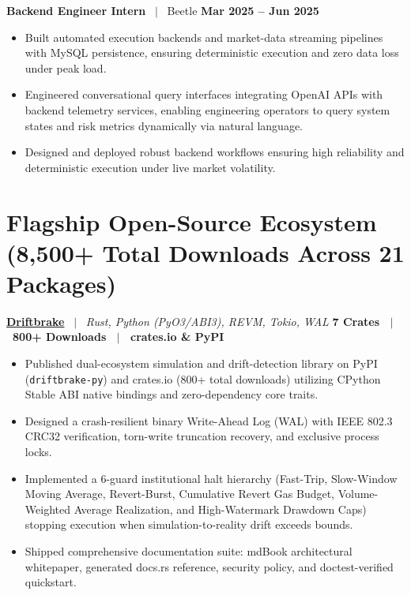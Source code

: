\documentclass[10pt,a4paper]{article}
\begin{document}
\textbf{Backend Engineer Intern} \ $|$ \ Beetle \hfill \textbf{Mar 2025 -- Jun 2025}
\begin{itemize}
    \item Built automated execution backends and market-data streaming pipelines with MySQL persistence, ensuring deterministic execution and zero data loss under peak load.
    \item Engineered conversational query interfaces integrating OpenAI APIs with backend telemetry services, enabling engineering operators to query system states and risk metrics dynamically via natural language.
    \item Designed and deployed robust backend workflows ensuring high reliability and deterministic execution under live market volatility.
\end{itemize}

\section{Flagship Open-Source Ecosystem (8,500+ Total Downloads Across 21 Packages)}

\textbf{\href{https://github.com/Xtley001/driftbrake}{Driftbrake}} \ $|$ \ \textit{Rust, Python (PyO3/ABI3), REVM, Tokio, WAL} \hfill \textbf{7 Crates \ $|$ \ 800+ Downloads \ $|$ \ crates.io \& PyPI}
\begin{itemize}
    \item Published dual-ecosystem simulation and drift-detection library on PyPI (\texttt{driftbrake-py}) and crates.io (800+ total downloads) utilizing CPython Stable ABI native bindings and zero-dependency core traits.
    \item Designed a crash-resilient binary Write-Ahead Log (WAL) with IEEE 802.3 CRC32 verification, torn-write truncation recovery, and exclusive process locks.
    \item Implemented a 6-guard institutional halt hierarchy (Fast-Trip, Slow-Window Moving Average, Revert-Burst, Cumulative Revert Gas Budget, Volume-Weighted Average Realization, and High-Watermark Drawdown Caps) stopping execution when simulation-to-reality drift exceeds bounds.
    \item Shipped comprehensive documentation suite: mdBook architectural whitepaper, generated docs.rs reference, security policy, and doctest-verified quickstart.
\end{itemize}
\end{document}
